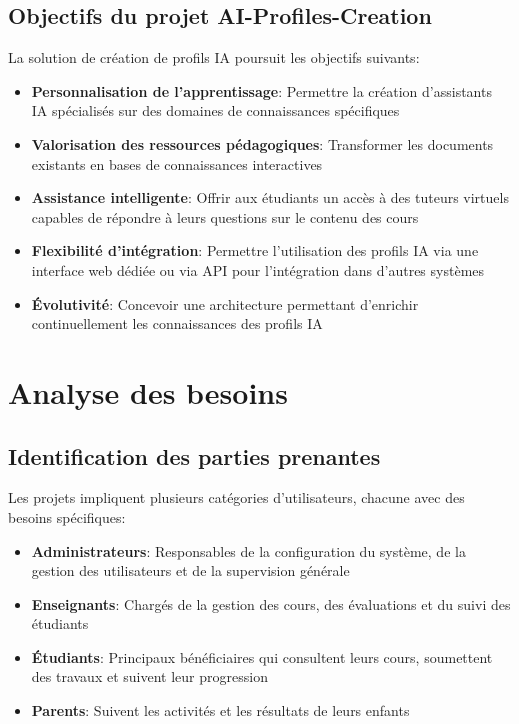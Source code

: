 \subsection{Objectifs du projet AI-Profiles-Creation}

La solution de création de profils IA poursuit les objectifs suivants:

\begin{itemize}
  \item \textbf{Personnalisation de l'apprentissage}: Permettre la création d'assistants IA spécialisés sur des domaines de connaissances spécifiques
  
  \item \textbf{Valorisation des ressources pédagogiques}: Transformer les documents existants en bases de connaissances interactives
  
  \item \textbf{Assistance intelligente}: Offrir aux étudiants un accès à des tuteurs virtuels capables de répondre à leurs questions sur le contenu des cours
  
  \item \textbf{Flexibilité d'intégration}: Permettre l'utilisation des profils IA via une interface web dédiée ou via API pour l'intégration dans d'autres systèmes
  
  \item \textbf{Évolutivité}: Concevoir une architecture permettant d'enrichir continuellement les connaissances des profils IA
\end{itemize}

\section{Analyse des besoins}

\subsection{Identification des parties prenantes}

Les projets impliquent plusieurs catégories d'utilisateurs, chacune avec des besoins spécifiques:

\begin{itemize}
  \item \textbf{Administrateurs}: Responsables de la configuration du système, de la gestion des utilisateurs et de la supervision générale
  
  \item \textbf{Enseignants}: Chargés de la gestion des cours, des évaluations et du suivi des étudiants
  
  \item \textbf{Étudiants}: Principaux bénéficiaires qui consultent leurs cours, soumettent des travaux et suivent leur progression
  
  \item \textbf{Parents}: Suivent les activités et les résultats de leurs enfants
  
\end{itemize}

